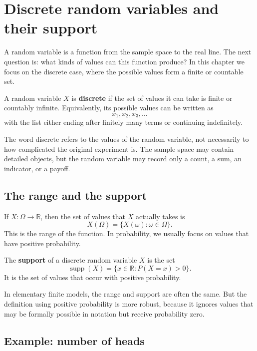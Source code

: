\section{Discrete random variables and their support}

A random variable is a function from the sample space to the real line. The next
question is: what kinds of values can this function produce? In this chapter we
focus on the discrete case, where the possible values form a finite or countable
set.

\begin{definitionbox}
A random variable \(X\) is \textbf{discrete} if the set of values it can take is
finite or countably infinite. Equivalently, its possible values can be written as
\[
x_1,x_2,x_3,\ldots
\]
with the list either ending after finitely many terms or continuing indefinitely.
\end{definitionbox}

The word discrete refers to the values of the random variable, not necessarily to
how complicated the original experiment is. The sample space may contain detailed
objects, but the random variable may record only a count, a sum, an indicator, or
a payoff.

\subsection*{The range and the support}

If \(X:\Omega\to\mathbb{R}\), then the set of values that \(X\) actually takes is
\[
X(\Omega)=\{X(\omega):\omega\in\Omega\}.
\]
This is the range of the function. In probability, we usually focus on values
that have positive probability.

\begin{definitionbox}
The \textbf{support} of a discrete random variable \(X\) is the set
\[
\operatorname{supp}(X)=\{x\in\mathbb{R}:P(X=x)>0\}.
\]
It is the set of values that occur with positive probability.
\end{definitionbox}

In elementary finite models, the range and support are often the same. But the
definition using positive probability is more robust, because it ignores values
that may be formally possible in notation but receive probability zero.

\subsection*{Example: number of heads}

